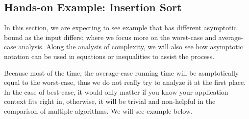 \documentclass[../main.tex]{subfiles}
\begin{document}
 


\subsection{Hands-on Example: Insertion Sort}
\label{sec_time_complexity}
In this section, we are expecting to see example that has different asymptotic bound as the input differs; where we focus more on the worst-case and average-case analysis. Along the analysis of complexity, we will also see how asymptotic notation can be used in equations or inequalities to assist the process. 

Because most of the time, the average-case running time will be asmptotically equal to the worst-case, thus we do not really try to analyze it at the first place. In the case of best-case, it would only matter if you know your application context fits right in, otherwise, it will be trivial and non-helpful in the comparison of multiple  algorithms. We will see example below. 
\end{document}
